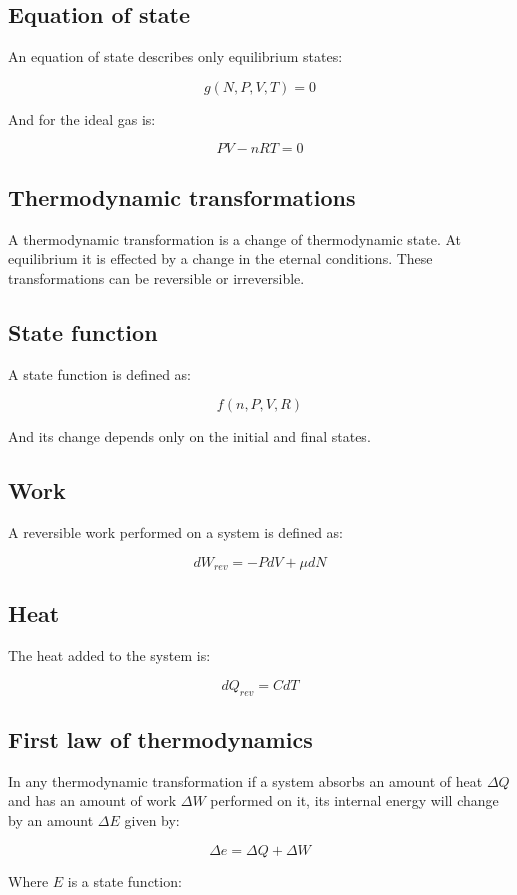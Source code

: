 	\subsection{Equation of state}
	An equation of state describes only equilibrium states:

	$$g(N, P, V, T) = 0$$

	And for the ideal gas is:

	$$PV-nRT=0$$

	\subsection{Thermodynamic transformations}
	A thermodynamic transformation is a change of thermodynamic state.
	At equilibrium it is effected by a change in the eternal conditions.
	These transformations can be reversible or irreversible.

	\subsection{State function}
	A state function is defined as:

	$$f(n, P, V, R)$$

	And its change depends only on the initial and final states.

	\subsection{Work}
	A reversible work performed on a system is defined as:

	$$dW_{rev} = -PdV + \mu dN$$

	\subsection{Heat}
	The heat added to the system is:

	$$dQ_{rev} = CdT$$

	\subsection{First law of thermodynamics}
	In any thermodynamic transformation if a system absorbs an amount of heat $\Delta Q$ and has an amount of work $\Delta W$ performed on it, its internal energy will change by an amount $\Delta E$ given by:

	$$\Delta e = \Delta Q + \Delta W$$

	Where $E$ is a state function:


